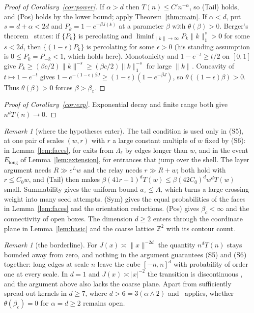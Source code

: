 \documentclass[11pt]{article}
\theoremstyle{definition}
\theoremstyle{remark}
\newtheorem{remark}[theorem]{Remark}
\numberwithin{equation}{section}
\newcommand{\Z}{\mathbb Z}
\newcommand{\1}{\mathbf 1}
\newcommand{\Lam}{\Lambda}
\newcommand{\norm}[1]{\|#1\|}
\begin{document}
\begin{proof}[Proof of Corollary~\ref{cor:power}]
If $\alpha>d$ then $T(n)\le C'n^{-\alpha}$, so (Tail) holds, and (Pos) holds by the lower bound;
apply Theorem~\ref{thm:main}. If $\alpha<d$, put $s=d+\alpha<2d$ and $P_k=1-e^{-\beta J(k)}$ at a
parameter $\beta$ with $\theta(\beta)>0$. Berger's theorem~\cite[Theorem~2.6]{Berger2002} states: if
$\{P_k\}$ is percolating and $\liminf_{\norm{k}\to\infty}P_k\norm{k}_1^{s}>0$ for some $s<2d$, then
$\{(1-\epsilon)P_k\}$ is percolating for some $\epsilon>0$ (his standing assumption is
$0\le P_k=P_{-k}<1$, which holds here). Monotonicity and $1-e^{-t}\ge t/2$ on $[0,1]$ give
$P_k\ge(\beta c/2)\norm{k}^{-s}\ge(\beta c/2)\norm{k}_1^{-s}$ for large $\norm{k}$. Concavity of
$t\mapsto1-e^{-t}$ gives $1-e^{-(1-\epsilon)\beta J}\ge(1-\epsilon)(1-e^{-\beta J})$, so
$\theta((1-\epsilon)\beta)>0$. Thus $\theta(\beta)>0$ forces $\beta>\beta_c$.
\end{proof}

\begin{proof}[Proof of Corollary~\ref{cor:exp}]
Exponential decay and finite range both give $n^dT(n)\to0$.
\end{proof}

\begin{remark}[where the hypotheses enter]\label{rem:hyp}
The tail condition is used only in (S5), at one pair of scales $(w,r)$ with $r$ a large constant
multiple of $w$ fixed by (S6): in
Lemma~\ref{lem:faces}, for exits from $\Lam_\ell$ by edges longer than $w$, and in the event
$E_{\mathrm{long}}$ of Lemma~\ref{lem:extension}, for entrances that jump over the shell. The layer
argument needs $R\gg e^Lw$ and the relay needs $r\gg R+w$; both hold with $r\le C_0w$, and
(Tail) then makes $\beta(41r+1)^dT(w)\le\beta(42C_0)^dw^dT(w)$ small. Summability gives the uniform bound $a_z\le A$, which turns a large crossing
weight into many seed attempts. (Sym) gives the equal probabilities of the faces in
Lemma~\ref{lem:faces} and the orientation reductions. (Pos) gives $\beta_c<\infty$ and the
connectivity of open boxes. The dimension $d\ge2$ enters through the coordinate plane in
Lemma~\ref{lem:basic} and the coarse lattice $\Z^2$ with its contour count.
\end{remark}

\begin{remark}[the borderline]\label{rem:border}
For $J(x)\asymp\norm{x}^{-2d}$ the quantity $n^dT(n)$ stays bounded away from zero, and nothing in the
argument guarantees (S5) and (S6) together: long edges at scale $n$ leave the cube $[-n,n]^d$ with
probability of order one at every scale. In $d=1$ and $J(x)\asymp|x|^{-2}$ the transition is discontinuous
\cite{AizenmanNewman1986,DuminilCopinGarbanTassion2020}, and the argument above also lacks the coarse
plane. Apart from sufficiently spread-out kernels in $d\ge7$, where $d>6=3(\alpha\wedge2)$
and~\cite{HeydenreichHofstadSakai2008} applies, whether $\theta(\beta_c)=0$ for $\alpha=d\ge2$ remains open.
\end{remark}
\end{document}
